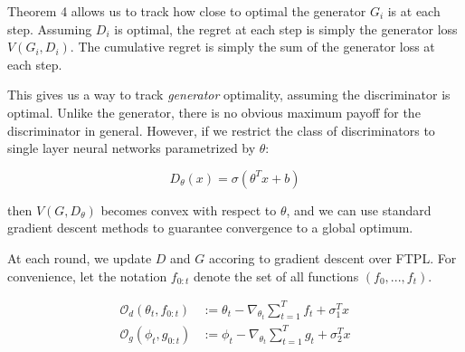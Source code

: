 \documentclass[]{article}
\theoremstyle{definition}
\begin{document}
Theorem 4 allows us to track how close to optimal the generator $G_i$ is at each step. Assuming $D_i$ is optimal, the regret at each step is simply the generator loss $V(G_i, D_i)$. The cumulative regret is simply the sum of the generator loss at each step. 

This gives us a way to track \emph{generator} optimality, assuming the discriminator is optimal. Unlike the generator, there is no obvious maximum payoff for the discriminator in general. 
However, if we restrict the class of discriminators to single layer neural networks parametrized by $\theta$:

\begin{equation}
    D_\theta(x) = \sigma(\theta^Tx + b) 
\end{equation}

then $V(G, D_\theta)$ becomes convex with respect to $\theta$, and we can use standard gradient descent methods to guarantee convergence to a global optimum. 

At each round, we update $D$ and $G$ accoring to gradient descent over FTPL. For convenience, let the notation $f_{0:t}$ denote the set of all functions $(f_0,...,f_t)$.

\begin{align}
     \mathcal{O}_d(\theta_t, f_{0:t}) &:= \theta_t - \nabla_{\theta_t} \sum_{t=1}^T f_t + \sigma_1^Tx \\
 \mathcal{O}_g(\phi_t, g_{0:t}) &:= \phi_t - \nabla_{\theta_t} \sum_{t=1}^T g_t + \sigma_2^Tx 
\end{align}
\end{document}
